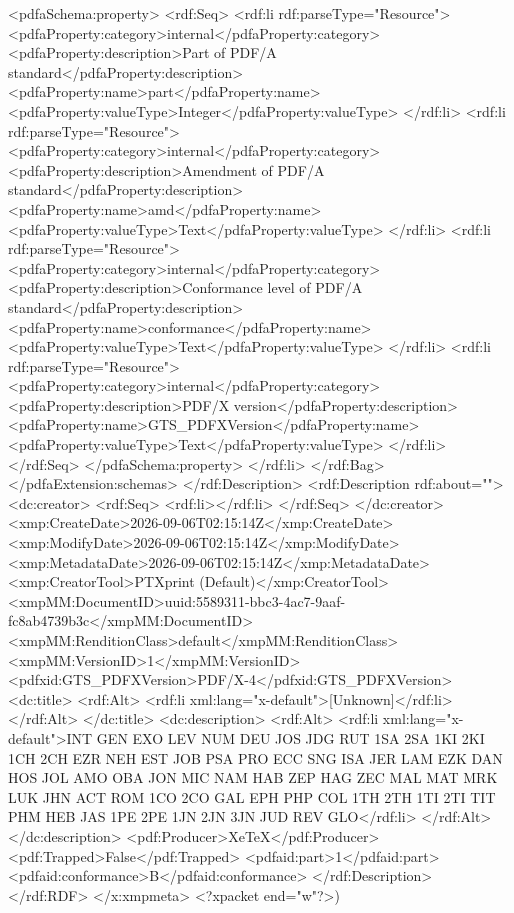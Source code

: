 {              <pdfaSchema:property>
                <rdf:Seq>
                  <rdf:li rdf:parseType="Resource">
                    <pdfaProperty:category>internal</pdfaProperty:category>
                    <pdfaProperty:description>Part of PDF/A standard</pdfaProperty:description>
                    <pdfaProperty:name>part</pdfaProperty:name>
                    <pdfaProperty:valueType>Integer</pdfaProperty:valueType>
                  </rdf:li>
                  <rdf:li rdf:parseType="Resource">
                    <pdfaProperty:category>internal</pdfaProperty:category>
                    <pdfaProperty:description>Amendment of PDF/A standard</pdfaProperty:description>
                    <pdfaProperty:name>amd</pdfaProperty:name>
                    <pdfaProperty:valueType>Text</pdfaProperty:valueType>
                  </rdf:li>
                  <rdf:li rdf:parseType="Resource">
                    <pdfaProperty:category>internal</pdfaProperty:category>
                    <pdfaProperty:description>Conformance level of PDF/A standard</pdfaProperty:description>
                    <pdfaProperty:name>conformance</pdfaProperty:name>
                    <pdfaProperty:valueType>Text</pdfaProperty:valueType>
                  </rdf:li>
                  <rdf:li rdf:parseType="Resource">
                    <pdfaProperty:category>internal</pdfaProperty:category>
                    <pdfaProperty:description>PDF/X version</pdfaProperty:description>
                    <pdfaProperty:name>GTS_PDFXVersion</pdfaProperty:name>
                    <pdfaProperty:valueType>Text</pdfaProperty:valueType>
                  </rdf:li>
                </rdf:Seq>
              </pdfaSchema:property>
            </rdf:li>
          </rdf:Bag>
        </pdfaExtension:schemas>
      </rdf:Description>
      <rdf:Description rdf:about="">
        <dc:creator>
          <rdf:Seq>
            <rdf:li></rdf:li>
          </rdf:Seq>
        </dc:creator>
        <xmp:CreateDate>2026-09-06T02:15:14Z</xmp:CreateDate>
        <xmp:ModifyDate>2026-09-06T02:15:14Z</xmp:ModifyDate>
        <xmp:MetadataDate>2026-09-06T02:15:14Z</xmp:MetadataDate>
        <xmp:CreatorTool>PTXprint (Default)</xmp:CreatorTool>
        <xmpMM:DocumentID>uuid:5589311-bbc3-4ac7-9aaf-fc8ab4739b3c</xmpMM:DocumentID>
        <xmpMM:RenditionClass>default</xmpMM:RenditionClass>
        <xmpMM:VersionID>1</xmpMM:VersionID>
        <pdfxid:GTS_PDFXVersion>PDF/X-4</pdfxid:GTS_PDFXVersion>
        <dc:title>
          <rdf:Alt>
            <rdf:li xml:lang="x-default">[Unknown]</rdf:li>
          </rdf:Alt>
        </dc:title>
        <dc:description>
          <rdf:Alt>
            <rdf:li xml:lang="x-default">INT GEN EXO LEV NUM DEU JOS JDG RUT 1SA 2SA 1KI 2KI 1CH 2CH EZR NEH EST JOB PSA PRO ECC SNG ISA JER LAM EZK DAN HOS JOL AMO OBA JON MIC NAM HAB ZEP HAG ZEC MAL MAT MRK LUK JHN ACT ROM 1CO 2CO GAL EPH PHP COL 1TH 2TH 1TI 2TI TIT PHM HEB JAS 1PE 2PE 1JN 2JN 3JN JUD REV GLO</rdf:li>
          </rdf:Alt>
        </dc:description>
        <pdf:Producer>XeTeX</pdf:Producer>
        <pdf:Trapped>False</pdf:Trapped>
      <pdfaid:part>1</pdfaid:part>
      <pdfaid:conformance>B</pdfaid:conformance>
      </rdf:Description>
  </rdf:RDF>
</x:xmpmeta>
<?xpacket end="w"?>)}
